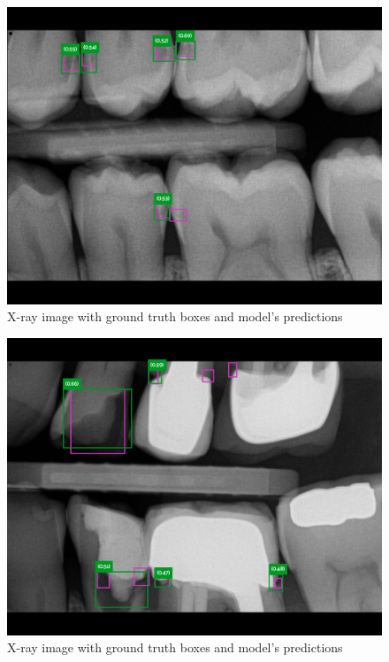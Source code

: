 \begin{figure}
    \includegraphics[width=0.9\linewidth]{images/no_rest2.png}
    \caption{X-ray image with ground truth boxes and model's predictions}
    \label{fig:pred_img2}
\end{figure}

\begin{figure}
    \includegraphics[width=0.9\linewidth]{images/rest1.png}
    \caption{X-ray image with ground truth boxes and model's predictions}
    \label{fig:pred_img3}
\end{figure}

